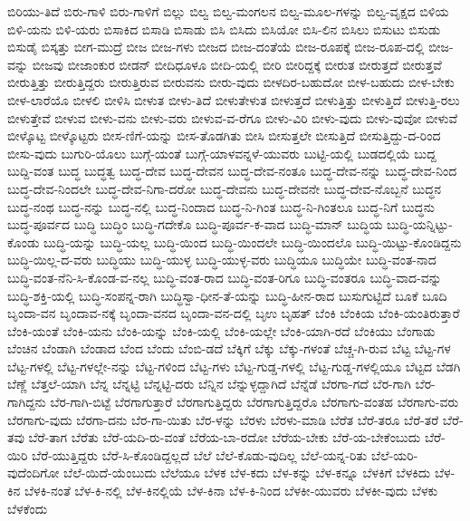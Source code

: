 {ಬಿರಿಯು-ತಿದೆ
ಬಿರು-ಗಾಳಿ
ಬಿರು-ಗಾಳಿಗೆ
ಬಿಲ್ಲು
ಬಿಲ್ವ
ಬಿಲ್ವ-ಮಂಗಲನ
ಬಿಲ್ವ-ಮೂಲ-ಗಳನ್ನು
ಬಿಲ್ವ-ವೃಕ್ಷದ
ಬಿಳಿಯ
ಬಿಳಿ-ಯನು
ಬಿಳಿ-ಯರು
ಬಿಸಾಕಿದ
ಬಿಸಾಡಿ
ಬಿಸಾಡು
ಬಿಸಿ
ಬಿಸಿದು
ಬಿಸಿಯೋ
ಬಿಸಿ-ಲಿನ
ಬಿಸಿಲು
ಬಿಸುಟು
ಬಿಸುಡು
ಬಿಸುಡೈ
ಬಿಸ್ಕತ್ತು
ಬೀಗ-ಮುದ್ರೆ
ಬೀಜ
ಬೀಜ-ಗಳು
ಬೀಜದ
ಬೀಜ-ದಂತೆಯೆ
ಬೀಜ-ರೂಪಕ್ಕೆ
ಬೀಜ-ರೂಪ-ದಲ್ಲಿ
ಬೀಜ-ವನ್ನು
ಬೀಜವು
ಬೀಜಾಂಕುರ
ಬೀಡನ್
ಬೀದಿಧೂಳೂ
ಬೀದಿ-ಯಲ್ಲಿ
ಬೀರಿ
ಬೀರಿದ್ದಕ್ಕೆ
ಬೀರುತ
ಬೀರುತ್ತದೆ
ಬೀರುತ್ತವೆ
ಬೀರುತ್ತಿತ್ತು
ಬೀರುತ್ತಿದ್ದರು
ಬೀರುತ್ತಿರುವ
ಬೀರುವನು
ಬೀರು-ವುದು
ಬೀಳದಿರ-ಬಹುದೋ
ಬೀಳ-ಬಹುದು
ಬೀಳ-ಬೇಕು
ಬೀಳ-ಲಾರೆಯೊ
ಬೀಳಲಿ
ಬೀಳಿಸಿ
ಬೀಳುತ
ಬೀಳು-ತಿದೆ
ಬೀಳುತೇಳುತ
ಬೀಳುತ್ತದೆ
ಬೀಳುತ್ತಿತ್ತು
ಬೀಳುತ್ತಿದೆ
ಬೀಳುತ್ತಿ-ರಲು
ಬೀಳುತ್ತೇವೆ
ಬೀಳುವ
ಬೀಳು-ವನು
ಬೀಳು-ವರು
ಬೀಳುವ-ವ-ರೆಗೂ
ಬೀಳು-ವಿರಿ
ಬೀಳು-ವುದು
ಬೀಳು-ವುವೋ
ಬೀಳುವೆ
ಬೀಳ್ಕೊಟ್ಟ
ಬೀಳ್ಕೊಟ್ಟರು
ಬೀಸ-ಣಿಗೆ-ಯನ್ನು
ಬೀಸ-ತೊಡಗಿತು
ಬೀಸಿ
ಬೀಸುತ್ತಲೇ
ಬೀಸುತ್ತಿದೆ
ಬೀಸುತ್ತಿದ್ದು-ದ-ರಿಂದ
ಬೀಸು-ವುದು
ಬುಗುರಿ-ಯೊಲು
ಬುಗ್ಗೆ-ಯಂತೆ
ಬುಗ್ಗೆ-ಯಾಳವನ್ನಳೆ-ಯುವರು
ಬುಟ್ಟಿ-ಯಲ್ಲಿ
ಬುಡದಲ್ಲಿಯೆ
ಬುದ್ದ
ಬುದ್ದಿ-ವಂತ
ಬುದ್ಧ
ಬುದ್ಧತ್ವ
ಬುದ್ಧ-ದೇವ
ಬುದ್ಧ-ದೇವನ
ಬುದ್ಧ-ದೇವ-ನಂತೂ
ಬುದ್ಧ-ದೇವ-ನನ್ನು
ಬುದ್ಧ-ದೇವ-ನಿಂದ
ಬುದ್ಧ-ದೇವ-ನಿಂದಲೇ
ಬುದ್ಧ-ದೇವ-ನಿಗಾ-ದರೋ
ಬುದ್ಧ-ದೇವನು
ಬುದ್ಧ-ದೇವನೇ
ಬುದ್ಧ-ದೇವ-ನೊಬ್ಬನೆ
ಬುದ್ಧನ
ಬುದ್ಧ-ನಂಥ
ಬುದ್ಧ-ನನ್ನು
ಬುದ್ಧ-ನಲ್ಲಿ
ಬುದ್ಧ-ನಿಂದಾದ
ಬುದ್ಧ-ನಿ-ಗಿಂತ
ಬುದ್ಧ-ನಿ-ಗಿಂತಲೂ
ಬುದ್ಧ-ನಿಗೆ
ಬುದ್ಧನು
ಬುದ್ಧ-ಪೂರ್ವದ
ಬುದ್ಧಿ
ಬುದ್ಧಿಂ
ಬುದ್ಧಿ-ಗದೇಕೊ
ಬುದ್ಧಿ-ಪೂರ್ವ-ಕ-ವಾದ
ಬುದ್ಧಿ-ಮಾನ್
ಬುದ್ಧಿಯ
ಬುದ್ಧಿ-ಯನ್ನಿಟ್ಟು-ಕೊಂಡು
ಬುದ್ಧಿ-ಯನ್ನು
ಬುದ್ಧಿ-ಯಲ್ಲ
ಬುದ್ಧಿ-ಯಿಂದ
ಬುದ್ಧಿ-ಯಿಂದಲೇ
ಬುದ್ಧಿ-ಯಿಂದಲೊ
ಬುದ್ಧಿ-ಯಿಟ್ಟು-ಕೊಂಡಿದ್ದನು
ಬುದ್ಧಿ-ಯಿಲ್ಲ-ದ-ವರು
ಬುದ್ಧಿಯು
ಬುದ್ಧಿ-ಯುಳ್ಳ
ಬುದ್ಧಿ-ಯುಳ್ಳ-ವರು
ಬುದ್ಧಿಯೂ
ಬುದ್ಧಿಯೇ
ಬುದ್ಧಿ-ವಂತ-ನಾದ
ಬುದ್ಧಿ-ವಂತ-ನೆನಿ-ಸಿ-ಕೊಂಡ-ವ-ನಲ್ಲ
ಬುದ್ಧಿ-ವಂತ-ರಾದ
ಬುದ್ಧಿ-ವಂತ-ರಿಗೂ
ಬುದ್ಧಿ-ವಂತರೂ
ಬುದ್ಧಿ-ವಾದ-ವನ್ನು
ಬುದ್ಧಿ-ಶಕ್ತಿ-ಯಲ್ಲಿ
ಬುದ್ಧಿ-ಸಂಪನ್ನ-ರಾಗಿ
ಬುದ್ಧಿಸ್ವಾ-ಧೀನ-ತೆ-ಯನ್ನು
ಬುದ್ಧಿ-ಹೀನ-ರಾದ
ಬುಸುಗುಟ್ಟಿದೆ
ಬೂಕೆ
ಬೂದಿ
ಬೃಂದಾ-ವನ
ಬೃಂದಾವ-ನಕ್ಕೆ
ಬೃಂದಾ-ವನದ
ಬೃಂದಾ-ವನ-ದಲ್ಲಿ
ಬೃಉ
ಬೃಹತ್
ಬೆಂಕಿ
ಬೆಂಕಿಯ
ಬೆಂಕಿ-ಯಂತಿರುತ್ತಾರೆ
ಬೆಂಕಿ-ಯಂತೆ
ಬೆಂಕಿ-ಯನು
ಬೆಂಕಿ-ಯನ್ನು
ಬೆಂಕಿ-ಯಲ್ಲಿ
ಬೆಂಕಿ-ಯಲ್ಲೇ
ಬೆಂಕಿ-ಯಾಗಿ-ರದೆ
ಬೆಂಕಿಯು
ಬೆಂಗಾಡು
ಬೆಂಚಿನ
ಬೆಂಡಾಗಿ
ಬೆಂಡಾದ
ಬೆಂದ
ಬೆಂದು
ಬೆಂಬಿ-ಡದೆ
ಬೆಕ್ಕಿಗೆ
ಬೆಕ್ಕು
ಬೆಕ್ಕು-ಗಳಂತೆ
ಬೆಚ್ಚ-ಗಿ-ರುವ
ಬೆಟ್ಟ
ಬೆಟ್ಟ-ಗಳ
ಬೆಟ್ಟ-ಗಳಲ್ಲಿ
ಬೆಟ್ಟ-ಗಳಲ್ಲೇ-ನನ್ನು
ಬೆಟ್ಟ-ಗಳಿಂದ
ಬೆಟ್ಟ-ಗಳು
ಬೆಟ್ಟ-ಗುಡ್ಡ-ಗಳಲ್ಲಿ
ಬೆಟ್ಟ-ಗುಡ್ಡ-ಗಳಲ್ಲಿಯೂ
ಬೆಟ್ಟದ
ಬೆಡಗಿ
ಬೆಣ್ಣೆ
ಬೆತ್ತಲೆ-ಯಾಗಿ
ಬೆನ್ನ
ಬೆನ್ನಟ್ಟಿ
ಬೆನ್ನಟ್ಟಿ-ದರು
ಬೆನ್ನಿನ
ಬೆನ್ನುಳ್ಳದ್ದಾಗಿದೆ
ಬೆನ್ನೆಡೆ
ಬೆರಗಾ-ಗದೆ
ಬೆರ-ಗಾಗಿ
ಬೆರ-ಗಾಗಿದ್ದನು
ಬೆರ-ಗಾಗಿ-ಬಿಟ್ಟೆ
ಬೆರಗಾಗುತ್ತಾರೆ
ಬೆರಗಾಗುತ್ತಿದ್ದರು
ಬೆರಗಾಗುತ್ತಿದ್ದರೊ
ಬೆರಗಾಗು-ವಂತಹ
ಬೆರಗಾಗು-ವರು
ಬೆರಗಾಗು-ವುದು
ಬೆರಗಾ-ದನು
ಬೆರ-ಗಾ-ಯಿತು
ಬೆರ-ಳನ್ನು
ಬೆರಳು
ಬೆರಳು-ಮಾಡಿ
ಬೆರೆತ
ಬೆರೆ-ತರೂ
ಬೆರೆ-ತರೆ
ಬೆರೆ-ತವು
ಬೆರೆ-ತಾಗ
ಬೆರೆತು
ಬೆರೆ-ಯದಿ-ರು-ವಂತೆ
ಬೆರೆಯ-ಬಾ-ರದೋ
ಬೆರೆಯ-ಬೇಕು
ಬೆರೆ-ಯ-ಬೇಕೆಂಬುದು
ಬೆರೆ-ಯಿರಿ
ಬೆರೆ-ಯುತ್ತಿದ್ದರು
ಬೆರೆ-ಸಿ-ಕೊಂಡಿದ್ದಲ್ಲದೆ
ಬೆಲೆ
ಬೆಲೆ-ಕೊಡು-ವುದಿಲ್ಲ
ಬೆಲೆ-ಯನ್ನ-ರಿತು
ಬೆಲೆ-ಯರಿ-ವುದೆಂದಿಗೋ
ಬೆಲೆ-ಯಿದೆ-ಯೆಂಬುದು
ಬೆಲೆಯೂ
ಬೆಳಕ
ಬೆಳ-ಕದು
ಬೆಳ-ಕನ್ನು
ಬೆಳ-ಕನ್ನೂ
ಬೆಳಕಿಗೆ
ಬೆಳಕಿದು
ಬೆಳ-ಕಿನ
ಬೆಳಕಿ-ನಂತೆ
ಬೆಳ-ಕಿ-ನಲ್ಲಿ
ಬೆಳ-ಕಿನಲ್ಲಿಯೆ
ಬೆಳ-ಕಿನಾ
ಬೆಳ-ಕಿ-ನಿಂದ
ಬೆಳಕೀ-ಯುವರು
ಬೆಳಕೀ-ವುದು
ಬೆಳಕು
ಬೆಳಕೆಂದು
}
